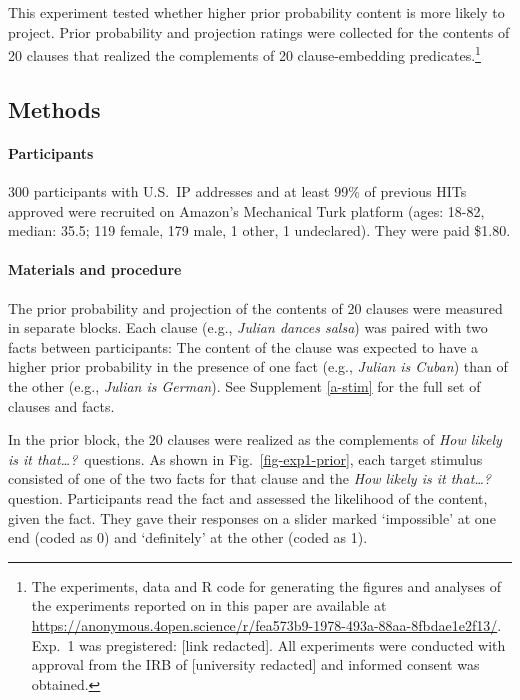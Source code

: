 \documentclass[11pt,fleqn]{article}
\newcommand{\6}{\mbox{$[\hspace*{-.6mm}[$}}
\newcommand{\9}{\mbox{$]\hspace*{-.6mm}]$}}
\begin{document}
This experiment tested whether higher prior probability content is more likely to project. Prior probability and projection ratings were collected for the contents of 20 clauses that realized the complements of 20 clause-embedding predicates.\footnote{\label{f-github}The experiments, data and R code for generating the figures and analyses of the experiments reported on in this paper are available at \url{https://anonymous.4open.science/r/fea573b9-1978-493a-88aa-8fbdae1e2f13/}. Exp.~1 was pregistered: [link redacted]. All experiments were conducted with approval from the IRB of [university redacted] and informed consent was obtained.}

\subsection{Methods} 
 
\paragraph{Participants} 300 participants with U.S.\ IP addresses and at least 99\% of previous HITs approved were recruited on Amazon's Mechanical Turk platform (ages: 18-82, median: 35.5; 119 female, 179 male, 1 other, 1 undeclared). They were paid \$1.80.

\paragraph{Materials and procedure} The prior probability and projection of the contents of 20 clauses were measured in separate blocks. Each clause (e.g., \emph{Julian dances salsa}) was paired with two facts between participants: The content of the clause was expected to have a higher prior probability in the presence of one fact (e.g., \emph{Julian is Cuban}) than of the other (e.g., \emph{Julian is German}). See Supplement \ref{a-stim} for the full set of clauses and facts. 

In the prior block, the 20 clauses were realized as the complements of {\em How likely is it that\ldots?}~questions. As shown in Fig.~\ref{fig-exp1-prior}, each target stimulus consisted of one of the two facts for that clause and the {\em How likely is it that\ldots?} question. 
Participants read the fact and assessed the likelihood of the content, given the fact. They gave their responses on a slider marked `impossible' at one end (coded as 0) and `definitely' at the other (coded as 1). 
\end{document}
